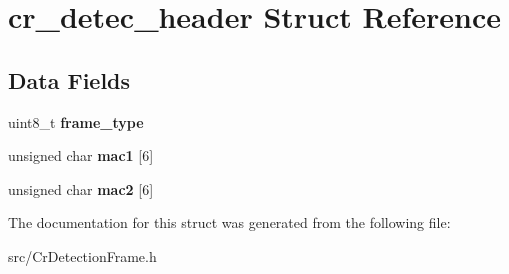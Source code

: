 \hypertarget{structcr__detec__header}{\section{cr\-\_\-detec\-\_\-header Struct Reference}
\label{structcr__detec__header}
}
\subsection*{Data Fields}
\begin{DoxyCompactItemize}
\item 
\hypertarget{structcr__detec__header_af61fd84e93789bf12d80f2732f187d5e}{uint8\-\_\-t {\bfseries frame\-\_\-type}}\label{structcr__detec__header_af61fd84e93789bf12d80f2732f187d5e}

\item 
\hypertarget{structcr__detec__header_af549d044df1a6a40b5b63ee70b02f8df}{unsigned char {\bfseries mac1} \mbox{[}6\mbox{]}}\label{structcr__detec__header_af549d044df1a6a40b5b63ee70b02f8df}

\item 
\hypertarget{structcr__detec__header_ac8ebecef9205b865066990a037276eff}{unsigned char {\bfseries mac2} \mbox{[}6\mbox{]}}\label{structcr__detec__header_ac8ebecef9205b865066990a037276eff}

\end{DoxyCompactItemize}


The documentation for this struct was generated from the following file\-:\begin{DoxyCompactItemize}
\item 
src/Cr\-Detection\-Frame.\-h\end{DoxyCompactItemize}
